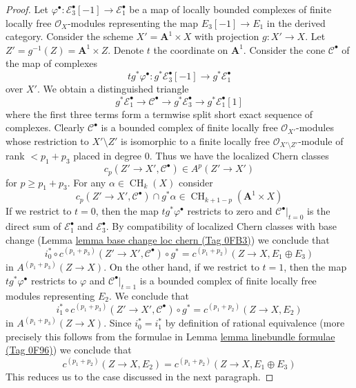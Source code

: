 \documentclass{amsart}
\theoremstyle{plain}
\theoremstyle{definition}
\theoremstyle{remark}
\numberwithin{equation}{subsection}
\def\CH{\mathop{\mathrm{CH}}\nolimits}
\begin{document}
\begin{proof}
\medskip\noindent
Let $\varphi^\bullet : \mathcal{E}_3^\bullet[-1] \to \mathcal{E}_1^\bullet$
be a map of locally bounded complexes of finite locally free
$\mathcal{O}_X$-modules representing the map $E_3[-1] \to E_1$
in the derived category. Consider the scheme
$X' = \mathbf{A}^1 \times X$ with projection
$g : X' \to X$. Let $Z' = g^{-1}(Z) = \mathbf{A}^1 \times Z$.
Denote $t$ the coordinate on $\mathbf{A}^1$. Consider the cone
$\mathcal{C}^\bullet$ of the map of complexes
$$
t g^*\varphi^\bullet :
g^*\mathcal{E}_3^\bullet[-1]
\longrightarrow
g^*\mathcal{E}_1^\bullet
$$
over $X'$. We obtain a distinguished triangle
$$
g^*\mathcal{E}_1^\bullet \to \mathcal{C}^\bullet \to
g^*\mathcal{E}_3^\bullet \to g^*\mathcal{E}_1^\bullet[1]
$$
where the first three terms form a termwise split short exact
sequence of complexes. Clearly $\mathcal{C}^\bullet$ is a
bounded complex of finite locally free $\mathcal{O}_{X'}$-modules
whose restriction to $X' \setminus Z'$ is isomorphic to a
finite locally free
$\mathcal{O}_{X' \setminus Z'}$-module of rank $< p_1 + p_3$
placed in degree $0$. Thus we have the localized Chern classes
$$
c_p(Z' \to X', \mathcal{C}^\bullet) \in A^p(Z' \to X')
$$
for $p \geq p_1 + p_3$. For any $\alpha \in \CH_k(X)$ consider
$$
c_p(Z' \to X', \mathcal{C}^\bullet) \cap g^*\alpha
\in \CH_{k + 1 - p}(\mathbf{A}^1 \times X)
$$
If we restrict to $t = 0$, then the map $t g^*\varphi^\bullet$
restricts to zero and $\mathcal{C}^\bullet|_{t = 0}$
is the direct sum of $\mathcal{E}_1^\bullet$ and $\mathcal{E}_3^\bullet$.
By compatibility of localized Chern classes with base change
(Lemma \href{https://stacks.math.columbia.edu/tag/0FB3}{lemma base change loc chern (Tag 0FB3)}) we conclude that
$$
i_0^* \circ c^{(p_1 + p_3)}(Z' \to X', \mathcal{C}^\bullet) \circ g^* =
c^{(p_1 + p_2)}(Z \to X, E_1 \oplus E_3)
$$
in $A^{(p_1 + p_3)}(Z \to X)$. On the other hand, if we restrict to $t = 1$,
then the map $t g^*\varphi^\bullet$
restricts to $\varphi$ and $\mathcal{C}^\bullet|_{t = 1}$
is a bounded complex of finite locally free modules representing $E_2$.
We conclude that
$$
i_1^* \circ c^{(p_1 + p_3)}(Z' \to X', \mathcal{C}^\bullet) \circ g^* =
c^{(p_1 + p_2)}(Z \to X, E_2)
$$
in $A^{(p_1 + p_3)}(Z \to X)$. Since $i_0^* = i_1^*$ by definition of
rational equivalence (more precisely this follows from the formulae in
Lemma \href{https://stacks.math.columbia.edu/tag/0F96}{lemma linebundle formulae (Tag 0F96)}) we conclude that
$$
c^{(p_1 + p_2)}(Z \to X, E_2) = c^{(p_1 + p_2)}(Z \to X, E_1 \oplus E_3)
$$
This reduces us to the case discussed in the next paragraph.


\end{proof}
\end{document}
